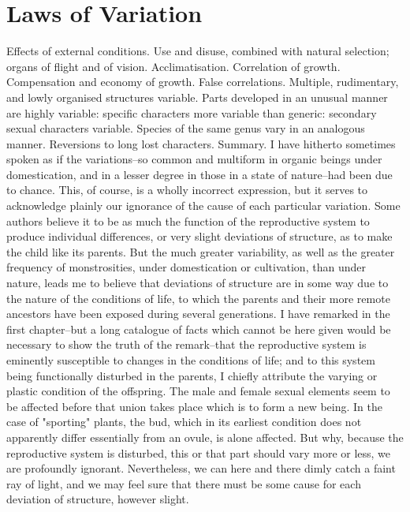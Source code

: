 \chapter{Laws of Variation}
Effects of external conditions. Use and disuse, combined with natural selection; organs of flight and of vision. Acclimatisation. Correlation of growth. Compensation and economy of growth. False correlations. Multiple, rudimentary, and lowly organised structures variable. Parts developed in an unusual manner are highly variable: specific characters more variable than generic: secondary sexual characters variable. Species of the same genus vary in an analogous manner. Reversions to long lost characters. Summary.
I have hitherto sometimes spoken as if the variations--so common and multiform in organic beings under domestication, and in a lesser degree in those in a state of nature--had been due to chance. This, of course, is a wholly incorrect expression, but it serves to acknowledge plainly our ignorance of the cause of each particular variation. Some authors believe it to be as much the function of the reproductive system to produce individual differences, or very slight deviations of structure, as to make the child like its parents. But the much greater variability, as well as the greater frequency of monstrosities, under domestication or cultivation, than under nature, leads me to believe that deviations of structure are in some way due to the nature of the conditions of life, to which the parents and their more remote ancestors have been exposed during several generations. I have remarked in the first chapter--but a long catalogue of facts which cannot be here given would be necessary to show the truth of the remark--that the reproductive system is eminently susceptible to changes in the conditions of life; and to this system being functionally disturbed in the parents, I chiefly attribute the varying or plastic condition of the offspring. The male and female sexual elements seem to be affected before that union takes place which is to form a new being. In the case of "sporting" plants, the bud, which in its earliest condition does not apparently differ essentially from an ovule, is alone affected. But why, because the reproductive system is disturbed, this or that part should vary more or less, we are profoundly ignorant. Nevertheless, we can here and there dimly catch a faint ray of light, and we may feel sure that there must be some cause for each deviation of structure, however slight.
